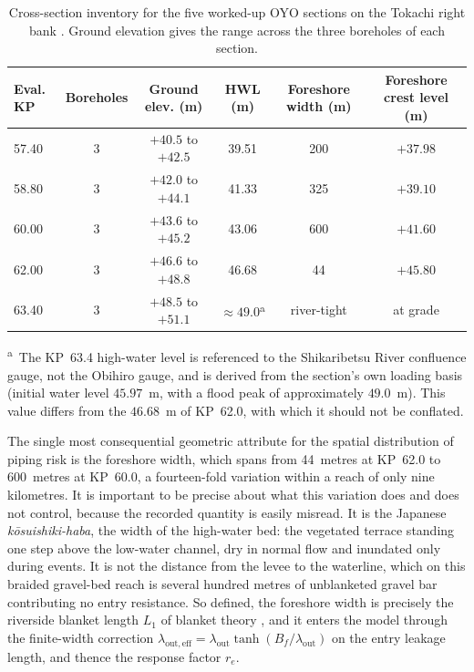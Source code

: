 \begin{table}[htbp]
\centering
\footnotesize
\caption{Cross-section inventory for the five worked-up OYO sections on the Tokachi right bank \parencite{oyo_1999}. Ground elevation gives the range across the three boreholes of each section.}
\label{tab:oyo_inventory}
\begin{tabular}{lccccc}
\toprule
Eval. KP & Boreholes & Ground elev. (m) & HWL (m) & Foreshore width (m) & Foreshore crest level (m) \\
\midrule
57.40 & 3 & $+40.5$ to $+42.5$ & 39.51 & 200 & $+37.98$ \\
58.80 & 3 & $+42.0$ to $+44.1$ & 41.33 & 325 & $+39.10$ \\
60.00 & 3 & $+43.6$ to $+45.2$ & 43.06 & 600 & $+41.60$ \\
62.00 & 3 & $+46.6$ to $+48.8$ & 46.68 & 44  & $+45.80$ \\
63.40 & 3 & $+48.5$ to $+51.1$ & $\approx 49.0$\textsuperscript{a} & river-tight & at grade \\
\bottomrule
\end{tabular}

\vspace{0.5em}
{\footnotesize \textsuperscript{a}~The KP~63.4 high-water level is referenced to the Shikaribetsu River confluence gauge, not the Obihiro gauge, and is derived from the section's own loading basis (initial water level $45.97$~m, with a flood peak of approximately $49.0$~m). This value differs from the $46.68$~m of KP~62.0, with which it should not be conflated.}
\end{table}

The single most consequential geometric attribute for the spatial distribution of piping risk is the foreshore width, which spans from 44~metres at KP~62.0 to 600~metres at KP~60.0, a fourteen-fold variation within a reach of only nine kilometres. It is important to be precise about what this variation does and does not control, because the recorded quantity is easily misread. It is the Japanese \emph{k\=osuishiki-haba}, the width of the high-water bed: the vegetated terrace standing one step above the low-water channel, dry in normal flow and inundated only during events. It is not the distance from the levee to the waterline, which on this braided gravel-bed reach is several hundred metres of unblanketed gravel bar contributing no entry resistance. So defined, the foreshore width is precisely the riverside blanket length $L_1$ of blanket theory \parencite{USACE2000}, and it enters the model through the finite-width correction $\lambda_\mathrm{out,eff} = \lambda_\mathrm{out}\tanh(B_f/\lambda_\mathrm{out})$ on the entry leakage length, and thence the response factor $r_e$.

